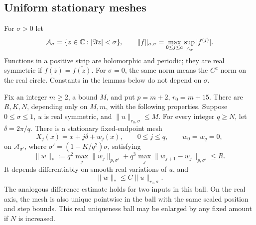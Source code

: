 \subsection{Uniform stationary meshes}

For \(\sigma>0\) let
\[
\mathcal A_\sigma=\{z\in\mathbb C:|\Im z|<\sigma\},\qquad
\|f\|_{a,\sigma}=\max_{0\le j\le a}
                  \sup_{\mathcal A_\sigma}|f^{(j)}|.
\]
Functions in a positive strip are holomorphic and periodic; they are
real symmetric if \(f(\bar z)=\overline{f(z)}\).
For \(\sigma=0\), the same norm means the \(C^a\) norm on the real
circle.  Constants in the lemmas below do not depend on \(\sigma\).

\begin{lemma}\label{ana:mesh-lemma}
Fix an integer \(m\ge2\), a bound \(M\), and put
\(p=m+2\), \(r_0=m+15\).
There are \(R,K,N\), depending only on \(M,m\), with the following
properties.  Suppose \(0\le\sigma\le1\), \(u\) is real symmetric, and
\(\|u\|_{r_0,\sigma}\le M\).  For every integer \(q\ge N\), let
\(\delta=2\pi/q\).  There is a stationary fixed-endpoint mesh
\begin{equation}\label{ana:mesh-definition}
X_j(x)=x+j\delta+w_j(x),\qquad 0\le j\le q,\qquad
w_0=w_q=0,
\end{equation}
on \(\mathcal A_{\sigma'}\), where
\(\sigma'=(1-K/q^2)\sigma\), satisfying
\begin{equation}\label{ana:mesh-norm}
\|w\|_*:=
q^2\max_j\|w_j\|_{p,\sigma'}
+q^3\max_j\|w_{j+1}-w_j\|_{p,\sigma'}\le R.
\end{equation}
It depends differentiably on smooth real variations of \(u\), and
\[
\|\dot w\|_*\le C\|\dot u\|_{r_0,\sigma}.
\]
The analogous difference estimate holds for two inputs in this ball.
On the real axis, the mesh is also unique pointwise in the ball with
the same scaled position and step bounds.  This real uniqueness ball
may be enlarged by any fixed amount if \(N\) is increased.
\end{lemma}

